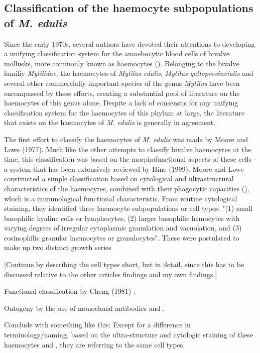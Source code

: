 \subsection{Classification of the haemocyte subpopulations of \emph{M. edulis}}
Since the early 1970s, several authors have devoted their attentions to developing a unifying classification system for the amoebocytic blood cells of bivalve mollusks, more commonly known as haemocytes (\cite{Cheng1980, delaBallina2022}). Belonging to the bivalve familiy \emph{Mytilidae}, the haemocytes of \emph{Mytilus edulis}, \emph{Mytilus galloprovincialis} and several other commercially important species of the genus \emph{Mytilus} have been encompassed by these efforts, creating a substantial pool of literature on the haemocytes of this genus alone. Despite a lack of consensus for any unifying classification system for the haemocytes of this phylum at large, the literature that exists on the haemocytes of \emph{M. edulis} is generally in agreement.

The first effort to classify the haemocytes of \emph{M. edulis} was made by Moore and Lowe (1977). Much like the other attempts to classify bivalve haemocytes at the time, this classification was based on the morphofunctional aspects of these cells - a system that has been extensively reviewed by Hine (1999). Moore and Lowe constructed a simple classification based on cytological and ultrastructural characteristics of the haemocytes, combined with their phagocytic capacities (\cite{Moore1977}), which is a immunological functional characteristic. From routine cytological staining, they identified three haemocyte subpopulations or cell types: "(1) small basophilic hyaline cells or lymphocytes, (2) larger basophilic hemocytes with varying degrees of irregular cytoplasmic granulation and vacuolation, and (3) eosinophilic granular haemocytes or granulocytes". These were postulated to make up two distinct growth series

[Continue by describing the cell types short, but in detail, since this has to be discussed relative to the other articles findings and my own findings.]

Functional classification by Cheng (1981) \cite{Cheng1984}.

Ontogeny by the use of monoclonal antibodies \cite{Noel1994} and \cite{Dyrynda1997}.

Conclude with something like this:
Except for a difference in terminology/naming, based on the ultra-structure and cytologic staining of these haemocytes and , they are referring to the same cell types.


